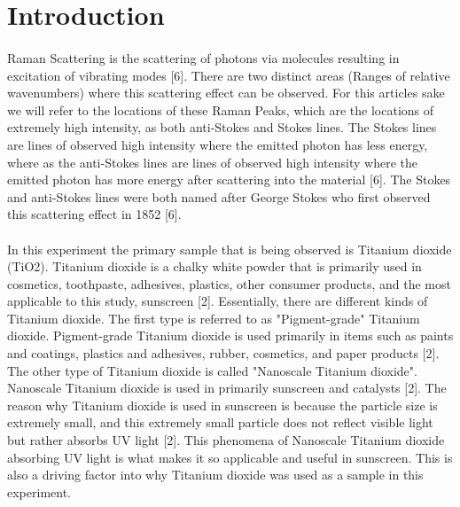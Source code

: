 \documentclass[12pt]{article}
\begin{document}
\section{Introduction}
\begin{multicols}{2}
\paragraph{}
\setlength{\parskip}{1em}
Raman Scattering is the scattering of photons via molecules resulting in excitation of vibrating modes [6]. There are two distinct areas (Ranges of relative wavenumbers) where this scattering effect can be observed. For this articles sake we will refer to the locations of these Raman Peaks, which are the locations of extremely high intensity, as both anti-Stokes and Stokes lines. The Stokes lines are lines of observed high intensity where the emitted photon has less energy, where as the anti-Stokes lines are lines of observed high intensity where the emitted photon has more energy after scattering into the material [6]. The Stokes and anti-Stokes lines were both named after George Stokes who first observed this scattering effect in 1852 [6]. 
\paragraph{}
\setlength{\parskip}{1em}
In this experiment the primary sample that is being observed is Titanium dioxide (TiO2). Titanium dioxide is a chalky white powder that is primarily used in cosmetics, toothpaste, adhesives, plastics, other consumer products, and the most applicable to this study, sunscreen [2]. Essentially, there are different kinds of Titanium dioxide. The first type is referred to as "Pigment-grade" Titanium dioxide. Pigment-grade Titanium dioxide is used primarily in items such as paints and coatings, plastics and adhesives, rubber, cosmetics, and paper products [2]. The other type of Titanium dioxide is called "Nanoscale Titanium dioxide". Nanoscale Titanium dioxide is used in primarily sunscreen and catalysts [2]. The reason why Titanium dioxide is used in sunscreen is because the particle size is extremely small, and this extremely small particle does not reflect visible light but rather absorbs UV light [2]. This phenomena of Nanoscale Titanium dioxide absorbing UV light is what makes it so applicable and useful in sunscreen. This is also a driving factor into why Titanium dioxide was used as a sample in this experiment. 
\end{multicols}
\end{document}
